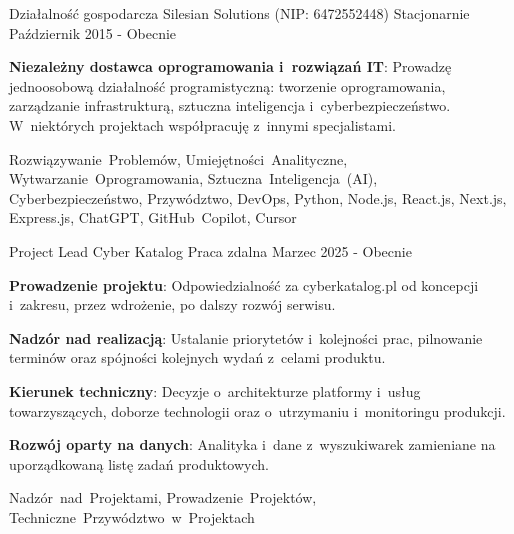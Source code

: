 
\begin{cventries}

\cventry
{Działalność gospodarcza} %
{Silesian Solutions (NIP: 6472552448)} %
{Stacjonarnie} %
{Październik 2015 - Obecnie} %
{
  \begin{cvitems} %
    \item {\textbf{Niezależny dostawca oprogramowania i~rozwiązań IT}: Prowadzę jednoosobową działalność programistyczną: tworzenie oprogramowania, zarządzanie infrastrukturą, sztuczna inteligencja i~cyberbezpieczeństwo. W~niektórych projektach współpracuję z~innymi specjalistami.}
  \end{cvitems}
}
{Rozwiązywanie~Problemów, Umiejętności~Analityczne, Wytwarzanie~Oprogramowania, Sztuczna~Inteligencja~(AI), Cyberbezpieczeństwo, Przywództwo, DevOps, Python, Node.js, React.js, Next.js, Express.js, ChatGPT, GitHub~Copilot, Cursor}

\cventry
{Project Lead} %
{Cyber Katalog} %
{Praca zdalna} %
{Marzec 2025 - Obecnie} %
{
  \begin{cvitems} %
    \item {\textbf{Prowadzenie projektu}: Odpowiedzialność za cyberkatalog.pl od koncepcji i~zakresu, przez wdrożenie, po dalszy rozwój serwisu.}
    \item {\textbf{Nadzór nad realizacją}: Ustalanie priorytetów i~kolejności prac, pilnowanie terminów oraz spójności kolejnych wydań z~celami produktu.}
    \item {\textbf{Kierunek techniczny}: Decyzje o~architekturze platformy i~usług towarzyszących, doborze technologii oraz o~utrzymaniu i~monitoringu produkcji.}
    \item {\textbf{Rozwój oparty na danych}: Analityka i~dane z~wyszukiwarek zamieniane na uporządkowaną listę zadań produktowych.}
  \end{cvitems}
}
{Nadzór~nad~Projektami, Prowadzenie~Projektów, Techniczne~Przywództwo~w~Projektach}


\end{cventries}

